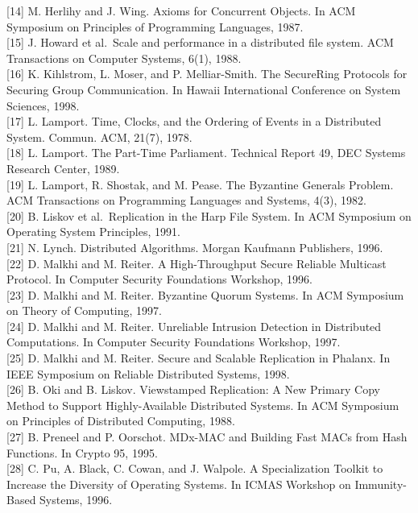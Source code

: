 \documentclass[
]{article}
\begin{document}
{[}14{]} M. Herlihy and J. Wing. Axioms for Concurrent Objects. In ACM
Symposium on Principles of Programming Languages, 1987.\\
{[}15{]} J. Howard et al.~Scale and performance in a distributed file
system. ACM Transactions on Computer Systems, 6(1), 1988.\\
{[}16{]} K. Kihlstrom, L. Moser, and P. Melliar-Smith. The SecureRing
Protocols for Securing Group Communication. In Hawaii International
Conference on System Sciences, 1998.\\
{[}17{]} L. Lamport. Time, Clocks, and the Ordering of Events in a
Distributed System. Commun. ACM, 21(7), 1978.\\
{[}18{]} L. Lamport. The Part-Time Parliament. Technical Report 49, DEC
Systems Research Center, 1989.\\
{[}19{]} L. Lamport, R. Shostak, and M. Pease. The Byzantine Generals
Problem. ACM Transactions on Programming Languages and Systems, 4(3),
1982.\\
{[}20{]} B. Liskov et al.~Replication in the Harp File System. In ACM
Symposium on Operating System Principles, 1991.\\
{[}21{]} N. Lynch. Distributed Algorithms. Morgan Kaufmann Publishers,
1996.\\
{[}22{]} D. Malkhi and M. Reiter. A High-Throughput Secure Reliable
Multicast Protocol. In Computer Security Foundations Workshop, 1996.\\
{[}23{]} D. Malkhi and M. Reiter. Byzantine Quorum Systems. In ACM
Symposium on Theory of Computing, 1997.\\
{[}24{]} D. Malkhi and M. Reiter. Unreliable Intrusion Detection in
Distributed Computations. In Computer Security Foundations Workshop,
1997.\\
{[}25{]} D. Malkhi and M. Reiter. Secure and Scalable Replication in
Phalanx. In IEEE Symposium on Reliable Distributed Systems, 1998.\\
{[}26{]} B. Oki and B. Liskov. Viewstamped Replication: A New Primary
Copy Method to Support Highly-Available Distributed Systems. In ACM
Symposium on Principles of Distributed Computing, 1988.\\
{[}27{]} B. Preneel and P. Oorschot. MDx-MAC and Building Fast MACs from
Hash Functions. In Crypto 95, 1995.\\
{[}28{]} C. Pu, A. Black, C. Cowan, and J. Walpole. A Specialization
Toolkit to Increase the Diversity of Operating Systems. In ICMAS
Workshop on Immunity-Based Systems, 1996.\\
\end{document}
